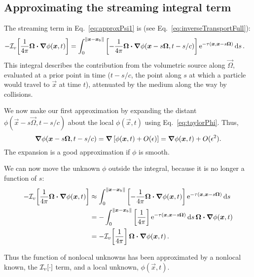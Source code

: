 \subsection{Approximating the streaming integral term}\label{sec:adStreaming}
The streaming term in Eq.~\eqref{eq:approxPsi1} is (see
Eq.~\eqref{eq:inverseTransportFull}):
\begin{align*}
- \mathcal{I}_{v}\!\left[\frac{1}{4\pi} \bm{\Omega}\bm{\cdot} \bm{\nabla} \phi(\bm{x}, t)\right]
  &= \int_{0}^{\left\| \bm{x} - \bm{x}_b \right\|}
    \left[ -\frac1{4\pi}\bm{\Omega}\bm{\cdot} \bm{\nabla} \phi(\bm{x} - s \bm{\Omega},
    t-s/c)
    \right]
    \mathop{}\!\mathrm{e}^{ -\tau(\bm{x}, \bm{x} - s \bm{\Omega})}
    \mathop{}\!\mathrm{d} s\,.
\end{align*}
This integral describes the contribution from the volumetric source  along
$\vec{\Omega}$, evaluated at a prior
point in time ($t-s/c$, the point along $s$ at which a particle would travel
to $\vec{x}$ at time $t$), attenuated by the medium along the way by collisions.

We now make our first approximation by expanding the distant $\phi(\vec{x} - s
\vec{\Omega}, t-s/c)$ about the local $\phi(\vec{x}, t)$ using
Eq.~\eqref{eq:taylorPhi}. Thus,
\begin{equation*}
  \bm{\nabla} \phi(\bm{x} - s \bm{\Omega}, t-s/c)
  = \bm{\nabla} \left[ \phi(\bm{x}, t) + O(\epsilon) \right]
  = \bm{\nabla} \phi(\bm{x}, t) + O(\epsilon^2).
\end{equation*}
The expansion is a good approximation if $\phi$ is smooth.

We can now move the unknown $\phi$ outside the integral,
because it is no longer a function of $s$:
\begin{align}\nonumber
- \mathcal{I}_{v}\!\left[\frac{1}{4\pi} \bm{\Omega}\bm{\cdot} \bm{\nabla} \phi(\bm{x}, t)\right]
  &\approx \int_{0}^{\left\| \bm{x} - \bm{x}_b \right\|}
    \left[ -\frac1{4\pi}\bm{\Omega}\bm{\cdot} \bm{\nabla} \phi(\bm{x},t) \right]
    \mathop{}\!\mathrm{e}^{ -\tau(\bm{x}, \bm{x} - s \bm{\Omega})}
    \mathop{}\!\mathrm{d} s
  \\\nonumber
  &= - \int_{0}^{\left\| \bm{x} - \bm{x}_b \right\|}
    \left[ \frac1{4\pi}\right]
    \mathop{}\!\mathrm{e}^{ -\tau(\bm{x}, \bm{x} - s \bm{\Omega})} \mathop{}\!\mathrm{d} s \,
    \bm{\Omega}\bm{\cdot} \bm{\nabla} \phi(\bm{x},t)
  \\\label{eq:streamingApprox}
  &= - \mathcal{I}_{v}\!\left[ \frac1{4\pi} \right] \bm{\Omega}\bm{\cdot} \bm{\nabla} \phi(\bm{x},t)
  \,.
\end{align}

Thus the function of nonlocal unknowns has been approximated by a nonlocal known, the
$\mathcal{I}_{v}\!\left[\cdot\right]$ term, and a local unknown, $\phi(\vec{x},t)$.

